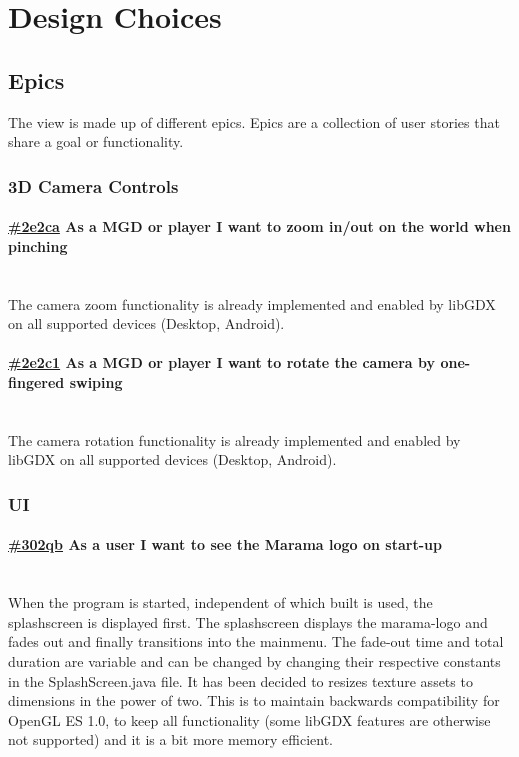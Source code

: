 \documentclass[10pt]{extarticle} %
\newcommand{\myparagraph}[1]{\paragraph{#1}\mbox{}\\} %
\begin{document}
    \section{Design Choices}

    \subsection{Epics}
    The view is made up of different epics.
    Epics are a collection of user stories that share a goal or functionality.

    \newcommand{\clickup}[1]{https://app.clickup.com/757520/761304/t/#1}

    \subsubsection{3D Camera Controls}
    \myparagraph{\href{\clickup{2e2ca}}{\#2e2ca} As a MGD or player I want to zoom in/out on the world when pinching}
    The camera zoom functionality is already implemented and enabled by libGDX on all supported devices (Desktop, Android).
    \myparagraph{\href{\clickup{2e2c1}}{\#2e2c1} As a MGD or player I want to rotate the camera by one-fingered swiping}
    The camera rotation functionality is already implemented and enabled by libGDX on all supported devices (Desktop, Android).

    \subsubsection{UI}
    \myparagraph{\href{\clickup{302qb}}{\#302qb} As a user I want to see the Marama logo on start-up}
    When the program is started, independent of which built is used, the splashscreen is displayed first.
    The splashscreen displays the marama-logo and fades out and finally transitions into the mainmenu.
    The fade-out time and total duration are variable and can be changed by changing their respective constants in the SplashScreen.java file.
    It has been decided to resizes texture assets to dimensions in the power of two.
    This is to maintain backwards compatibility for OpenGL ES 1.0, to keep all functionality (some libGDX features are otherwise not supported) and it is a bit more memory efficient.\cite{libgdxpottex}
\end{document}

